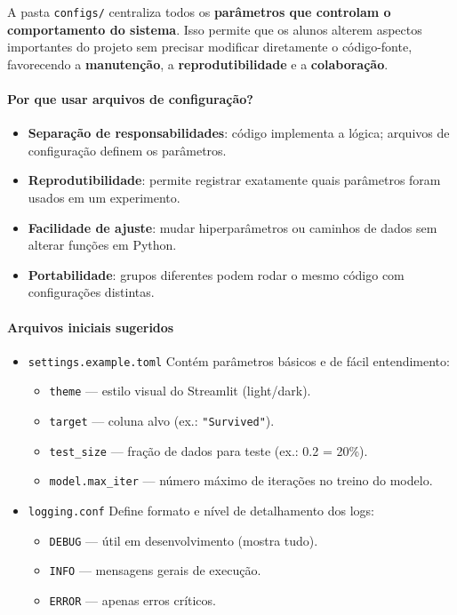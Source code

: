 \documentclass[12pt,a4paper]{article}
\begin{document}
A pasta \texttt{configs/} centraliza todos os \textbf{parâmetros que controlam o comportamento do sistema}.  
Isso permite que os alunos alterem aspectos importantes do projeto sem precisar modificar diretamente o código-fonte, favorecendo a \textbf{manutenção}, a \textbf{reprodutibilidade} e a \textbf{colaboração}.  

\paragraph{Por que usar arquivos de configuração?}
\begin{itemize}
  \item \textbf{Separação de responsabilidades}: código implementa a lógica; arquivos de configuração definem os parâmetros.  
  \item \textbf{Reprodutibilidade}: permite registrar exatamente quais parâmetros foram usados em um experimento.  
  \item \textbf{Facilidade de ajuste}: mudar hiperparâmetros ou caminhos de dados sem alterar funções em Python.  
  \item \textbf{Portabilidade}: grupos diferentes podem rodar o mesmo código com configurações distintas.  
\end{itemize}

\paragraph{Arquivos iniciais sugeridos}
\begin{itemize}
  \item \texttt{settings.example.toml}  
  Contém parâmetros básicos e de fácil entendimento:  
  \begin{itemize}
    \item \texttt{theme} — estilo visual do Streamlit (light/dark).  
    \item \texttt{target} — coluna alvo (ex.: \texttt{"Survived"}).  
    \item \texttt{test\_size} — fração de dados para teste (ex.: 0.2 = 20\%).  
    \item \texttt{model.max\_iter} — número máximo de iterações no treino do modelo.  
  \end{itemize}

  \item \texttt{logging.conf}  
  Define formato e nível de detalhamento dos logs:  
  \begin{itemize}
    \item \texttt{DEBUG} — útil em desenvolvimento (mostra tudo).  
    \item \texttt{INFO} — mensagens gerais de execução.  
    \item \texttt{ERROR} — apenas erros críticos.  
  \end{itemize}
\end{itemize}
\end{document}
